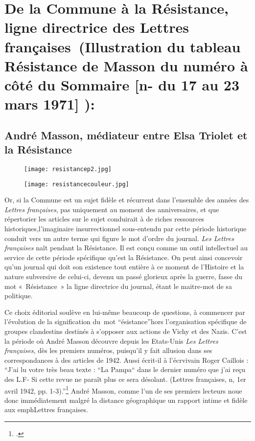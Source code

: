 


\section{De la Commune à la Résistance, ligne directrice des Lettres françaises (Illustration du tableau Résistance de Masson du numéro à côté du Sommaire [n- du 17 au 23 mars 1971] ):}

\subsection{André Masson, médiateur entre Elsa Triolet et la Résistance}

\begin{figure}[H]
   \centering
   \texttt{[image: resistancep2.jpg]}
	\caption{\cite{specialelsa}}\label{fig:Réssitance}
\end{figure}

\begin{figure}[H]
   \centering
   \texttt{[image: resistancecouleur.jpg]}
	\caption{\cite{specialelsa}}\label{fig:Réssitancecouleur}
\end{figure}



Or, si la Commune est un sujet fidèle et récurrent dans l’ensemble des années des \emph{Lettres françaises}, pas uniquement au moment des anniversaires, et que répertorier les articles sur le sujet conduirait à de riches ressources historiques,l’imaginaire insurrectionnel sous-entendu par cette période historique conduit vers un autre terme qui figure le mot d’ordre du journal. \emph{Les Lettres françaises} naît pendant la Résistance. Il est conçu comme un outil intellectuel au service de cette période spécifique qu’est la Résistance. On peut ainsi concevoir qu’un journal qui doit son existence tout entière à ce moment de l’Histoire et la nature subversive de celui-ci, devenu un passé glorieux après la guerre, fasse du mot « Résistance » la ligne directrice du journal, étant le maitre-mot de sa politique. 


	Ce choix éditorial soulève en lui-même beaucoup de questions, à commencer par l’évolution de la signification du mot \enquote{ésistance}hors l’organisation spécifique de groupes clandestins destinés à s’opposer aux actions de Vichy et des Nazis. C’est la période où André Masson découvre depuis les Etats-Unis \emph{Les Lettres françaises}, dès les premiers numéros, puisqu’il y  fait allusion dans ses correspondances à des articles de 1942. Aussi écrit-il à l’écrvivain Roger Caillois : \enquote{J’ai lu votre très beau texte : “La Pampa“ dans le dernier numéro que j’ai reçu des L.F- Si cette revue ne paraît plus ce sera désolant. (Lettres françaises, n, 1er avril 1942, pp. 1-3).}\footcite[p482]{anneessurrealistes} André Masson, comme l’un de ses premiers lecteurs noue donc immédiatement malgré la distance géographique un rapport intime et fidèle aux emph{Lettres françaises}. 


